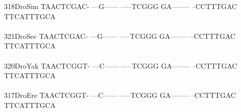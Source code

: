 \documentclass[11pt,twoside,reqno,a4paper]{article}
\begin{document}
{318\hspace*{1\charwidth}DroSim	TAACTCGAC-	---G------	-----TCGGG	GA--------	--CCTTTGAC	TTCATTTGCA	\\
\hspace*{4\charwidth}\hspace*{7\charwidth}\hspace*{1\charwidth}\hspace*{1\charwidth}\hspace*{1\charwidth}\hspace*{1\charwidth}\hspace*{1\charwidth}\hspace*{1\charwidth}\\
321\hspace*{1\charwidth}DroSec	TAACTCGAC-	---G------	-----TCGGG	GA--------	--CCTTTGAC	TTCATTTGCA	\\
\hspace*{4\charwidth}\hspace*{7\charwidth}\hspace*{1\charwidth}\hspace*{1\charwidth}\hspace*{1\charwidth}\hspace*{1\charwidth}\hspace*{1\charwidth}\hspace*{1\charwidth}\\
320\hspace*{1\charwidth}DroYak	TAACTCGGT-	---C------	-----TCGGG	GA--------	--CCTTTGAC	TTCATTTGCA	\\
\hspace*{4\charwidth}\hspace*{7\charwidth}\hspace*{1\charwidth}\hspace*{1\charwidth}\hspace*{1\charwidth}\hspace*{1\charwidth}\hspace*{1\charwidth}\hspace*{1\charwidth}\\
317\hspace*{1\charwidth}DroEre	TAACTCGGT-	---C------	-----TCGGG	GA--------	--CCTTTGAC	TTCATTTGCA	\\
\hspace*{4\charwidth}\hspace*{7\charwidth}\hspace*{1\charwidth}\hspace*{1\charwidth}\hspace*{1\charwidth}\hspace*{1\charwidth}\hspace*{1\charwidth}\hspace*{1\charwidth}\\
}
\end{document}
